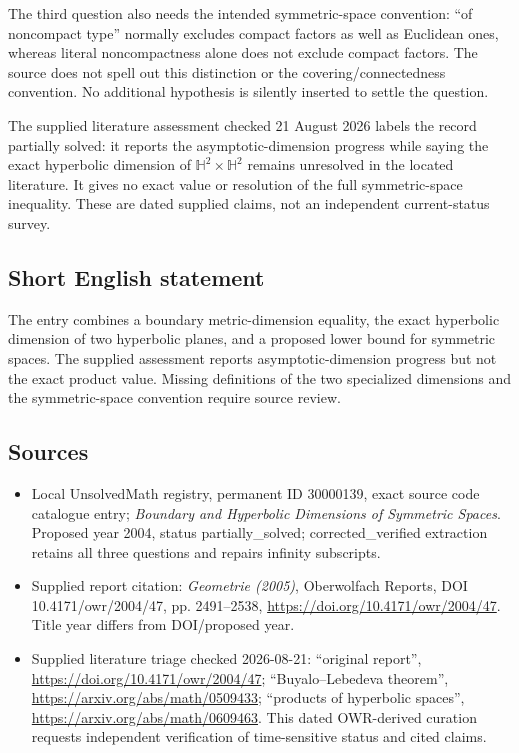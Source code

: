 \documentclass[11pt]{article}
\begin{document}
The third question also needs the intended symmetric-space convention: ``of noncompact type'' normally excludes compact factors as well as Euclidean ones, whereas literal noncompactness alone does not exclude compact factors. The source does not spell out this distinction or the covering/connectedness convention. No additional hypothesis is silently inserted to settle the question.

The supplied literature assessment checked 21 August 2026 labels the record partially solved: it reports the asymptotic-dimension progress while saying the exact hyperbolic dimension of $\mathbb H^2\times\mathbb H^2$ remains unresolved in the located literature. It gives no exact value or resolution of the full symmetric-space inequality. These are dated supplied claims, not an independent current-status survey.
\subsection{Short English statement}
The entry combines a boundary metric-dimension equality, the exact hyperbolic dimension of two hyperbolic planes, and a proposed lower bound for symmetric spaces. The supplied assessment reports asymptotic-dimension progress but not the exact product value. Missing definitions of the two specialized dimensions and the symmetric-space convention require source review.
\subsection{Sources}
\begin{itemize}
\item Local UnsolvedMath registry, permanent ID 30000139, exact source code catalogue entry; \emph{Boundary and Hyperbolic Dimensions of Symmetric Spaces}. Proposed year 2004, status partially\_solved; corrected\_verified extraction retains all three questions and repairs infinity subscripts.
\item Supplied report citation: \emph{Geometrie (2005)}, Oberwolfach Reports, DOI 10.4171/owr/2004/47, pp. 2491--2538, \url{https://doi.org/10.4171/owr/2004/47}. Title year differs from DOI/proposed year.
\item Supplied literature triage checked 2026-08-21: ``original report'', \url{https://doi.org/10.4171/owr/2004/47}; ``Buyalo--Lebedeva theorem'', \url{https://arxiv.org/abs/math/0509433}; ``products of hyperbolic spaces'', \url{https://arxiv.org/abs/math/0609463}. This dated OWR-derived curation requests independent verification of time-sensitive status and cited claims.
\end{itemize}
\end{document}
